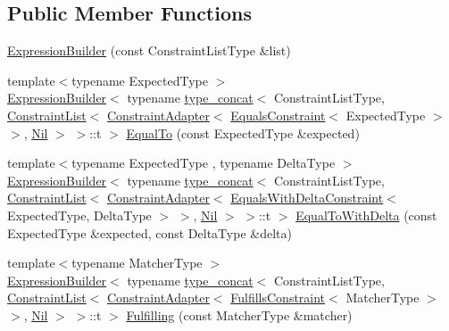\subsection*{Public Member Functions}
\begin{DoxyCompactItemize}
\item 
\mbox{\hyperlink{structsnowhouse_1_1ExpressionBuilder_a6213781ea7eb8ddcfef7dd202041354d}{Expression\+Builder}} (const Constraint\+List\+Type \&list)
\item 
{\footnotesize template$<$typename Expected\+Type $>$ }\\\mbox{\hyperlink{structsnowhouse_1_1ExpressionBuilder}{Expression\+Builder}}$<$ typename \mbox{\hyperlink{structsnowhouse_1_1type__concat}{type\+\_\+concat}}$<$ Constraint\+List\+Type, \mbox{\hyperlink{structsnowhouse_1_1ConstraintList}{Constraint\+List}}$<$ \mbox{\hyperlink{structsnowhouse_1_1ConstraintAdapter}{Constraint\+Adapter}}$<$ \mbox{\hyperlink{structsnowhouse_1_1EqualsConstraint}{Equals\+Constraint}}$<$ Expected\+Type $>$ $>$, \mbox{\hyperlink{structsnowhouse_1_1Nil}{Nil}} $>$ $>$\+::t $>$ \mbox{\hyperlink{structsnowhouse_1_1ExpressionBuilder_a90421497f5a1b73564f76eee13289003}{Equal\+To}} (const Expected\+Type \&expected)
\item 
{\footnotesize template$<$typename Expected\+Type , typename Delta\+Type $>$ }\\\mbox{\hyperlink{structsnowhouse_1_1ExpressionBuilder}{Expression\+Builder}}$<$ typename \mbox{\hyperlink{structsnowhouse_1_1type__concat}{type\+\_\+concat}}$<$ Constraint\+List\+Type, \mbox{\hyperlink{structsnowhouse_1_1ConstraintList}{Constraint\+List}}$<$ \mbox{\hyperlink{structsnowhouse_1_1ConstraintAdapter}{Constraint\+Adapter}}$<$ \mbox{\hyperlink{structsnowhouse_1_1EqualsWithDeltaConstraint}{Equals\+With\+Delta\+Constraint}}$<$ Expected\+Type, Delta\+Type $>$ $>$, \mbox{\hyperlink{structsnowhouse_1_1Nil}{Nil}} $>$ $>$\+::t $>$ \mbox{\hyperlink{structsnowhouse_1_1ExpressionBuilder_ae19545152046a26cd46d274b0f37b0db}{Equal\+To\+With\+Delta}} (const Expected\+Type \&expected, const Delta\+Type \&delta)
\item 
{\footnotesize template$<$typename Matcher\+Type $>$ }\\\mbox{\hyperlink{structsnowhouse_1_1ExpressionBuilder}{Expression\+Builder}}$<$ typename \mbox{\hyperlink{structsnowhouse_1_1type__concat}{type\+\_\+concat}}$<$ Constraint\+List\+Type, \mbox{\hyperlink{structsnowhouse_1_1ConstraintList}{Constraint\+List}}$<$ \mbox{\hyperlink{structsnowhouse_1_1ConstraintAdapter}{Constraint\+Adapter}}$<$ \mbox{\hyperlink{structsnowhouse_1_1FulfillsConstraint}{Fulfills\+Constraint}}$<$ Matcher\+Type $>$ $>$, \mbox{\hyperlink{structsnowhouse_1_1Nil}{Nil}} $>$ $>$\+::t $>$ \mbox{\hyperlink{structsnowhouse_1_1ExpressionBuilder_a3d8e6eb7428cbe0e5788b69da47099fa}{Fulfilling}} (const Matcher\+Type \&matcher)

\end{DoxyCompactItemize}
